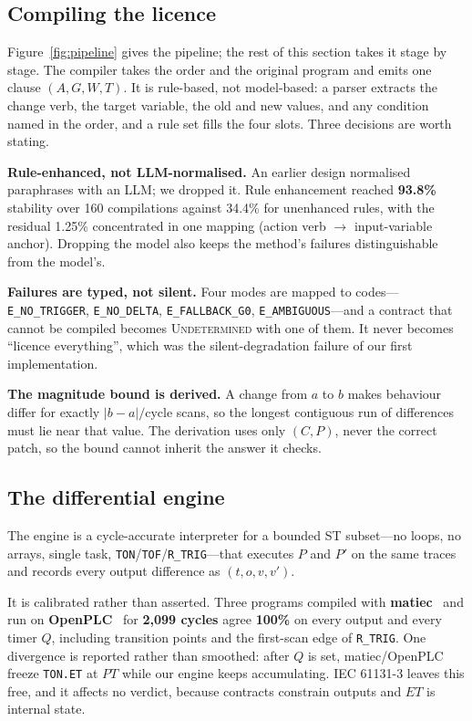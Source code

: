 \documentclass[acmsmall,screen,review,anonymous]{acmart}
\begin{document}
\subsection{Compiling the licence}

Figure~\ref{fig:pipeline} gives the pipeline; the rest of this section takes it stage by stage. The compiler takes the order and the original program and emits one clause $(A,G,W,T)$. It is rule-based, not model-based: a parser extracts the change verb, the target variable, the old and new values, and any condition named in the order, and a rule set fills the four slots. Three decisions are worth stating.

\textbf{Rule-enhanced, not LLM-normalised.} An earlier design normalised paraphrases with an LLM; we dropped it. Rule enhancement reached \textbf{93.8\%} stability over 160 compilations against 34.4\% for unenhanced rules, with the residual 1.25\% concentrated in one mapping (action verb $\to$ input-variable anchor). Dropping the model also keeps the method's failures distinguishable from the model's.

\textbf{Failures are typed, not silent.} Four modes are mapped to codes---\texttt{E\_NO\_TRIGGER}, \texttt{E\_NO\_DELTA}, \texttt{E\_FALLBACK\_G0}, \texttt{E\_AMBIGUOUS}---and a contract that cannot be compiled becomes \textsc{Undetermined} with one of them. It never becomes ``licence everything'', which was the silent-degradation failure of our first implementation.

\textbf{The magnitude bound is derived.} A change from $a$ to $b$ makes behaviour differ for exactly $|b-a|/\mathrm{cycle}$ scans, so the longest contiguous run of differences must lie near that value. The derivation uses only $(C,P)$, never the correct patch, so the bound cannot inherit the answer it checks.

\subsection{The differential engine}

The engine is a cycle-accurate interpreter for a bounded ST subset---no loops, no arrays, single task, \texttt{TON}/\texttt{TOF}/\texttt{R\_TRIG}---that executes $P$ and $P'$ on the same traces and records every output difference as $(t,o,v,v')$.

It is calibrated rather than asserted. Three programs compiled with \textbf{matiec}~\citep{matiec} and run on \textbf{OpenPLC}~\citep{openplc} for \textbf{2,099 cycles} agree \textbf{100\%} on every output and every timer $Q$, including transition points and the first-scan edge of \texttt{R\_TRIG}. One divergence is reported rather than smoothed: after $Q$ is set, matiec/OpenPLC freeze \texttt{TON.ET} at $PT$ while our engine keeps accumulating. IEC 61131-3 leaves this free, and it affects no verdict, because contracts constrain outputs and $ET$ is internal state.
\end{document}

